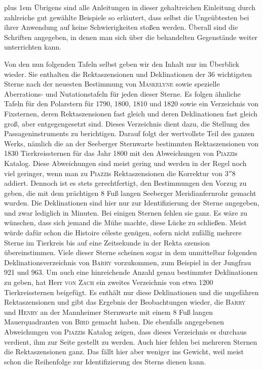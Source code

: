 \begingroup\rightskip=0pt plus 1em
Übrigens sind alle Anleitungen in dieser gehaltreichen Einleitung durch zahlreiche gut gewählte Beispiele so erläutert, dass selbst die Ungeübtesten bei ihrer Anwendung auf keine Schwierigkeiten stoßen werden. Überall sind die Schriften angegeben, in denen man sich über die behandelten Gegenstände weiter unterrichten kann.\par\endgroup

Von den nun folgenden Tafeln selbst geben wir den Inhalt nur im Überblick wieder. Sie enthalten die Rektaszensionen und Deklinationen der 36 wichtigsten Sterne nach der neuesten Bestimmung von \textsc{Maskelyne} sowie spezielle Aberrations- und Nutationstafeln für jeden dieser Sterne. Es folgen ähnliche Tafeln für den Polarstern für 1790, 1800, 1810 und 1820 sowie ein Verzeichnis von Fixsternen, deren Rektaszensionen fast gleich und deren Deklinationen fast gleich groß, aber entgegengesetzt sind. Dieses Verzeichnis dient dazu, die Stellung des Passageninstruments zu berichtigen. Darauf folgt der wertvollste Teil des ganzen Werks, nämlich die an der Seeberger Sternwarte bestimmten Rektaszensionen von 1830 Tierkreissternen für das Jahr 1800 mit den Abweichungen von \textsc{Piazzi}s Katalog. Diese Abweichungen sind meist gering und werden in der Regel noch viel geringer, wenn man zu \textsc{Piazzi}s Rektaszensionen die Korrektur von $3''8$ addiert. Dennoch ist es stets gerechtfertigt, den Bestimmungen den Vorzug zu geben, die mit dem prächtigen 8 Fuß langen Seeberger Meridianfernrohr gemacht wurden. Die Deklinationen sind hier nur zur Identifizierung der Sterne angegeben, und zwar lediglich in Minuten. Bei einigen Sternen fehlen sie ganz. Es wäre zu wünschen, dass sich jemand die Mühe machte, diese Lücke zu schließen. Meist würde dafür schon die Histoire céleste genügen, sofern nicht zufällig mehrere Sterne im Tierkreis bis auf eine Zeitsekunde in der Rekta%
%
szension übereinstimmen. Viele dieser Sterne scheinen sogar in dem unmittelbar folgenden Deklinationsverzeichnis von \textsc{Barry} vorzukommen, zum Beispiel in der Jungfrau 921 und 963. Um auch eine hinreichende Anzahl genau bestimmter Deklinationen zu geben, hat Herr \textsc{von Zach} ein zweites Verzeichnis von etwa 1200 Tierkreissternen beigefügt. Es enthält nur diese Deklinationen und die ungefähren Rektaszensionen und gibt das Ergebnis der Beobachtungen wieder, die \textsc{Barry} und \textsc{Henry} an der Mannheimer Sternwarte mit einem 8 Fuß langen Mauerquadranten von \textsc{Bird} gemacht haben. Die ebenfalls angegebenen Abweichungen von \textsc{Piazzi}s Katalog zeigen, dass dieses Verzeichnis es durchaus verdient, ihm zur Seite gestellt zu werden. Auch hier fehlen bei mehreren Sternen die Rektaszensionen ganz. Das fällt hier aber weniger ins Gewicht, weil meist schon die Reihenfolge zur Identifizierung des Sterns dienen kann.

